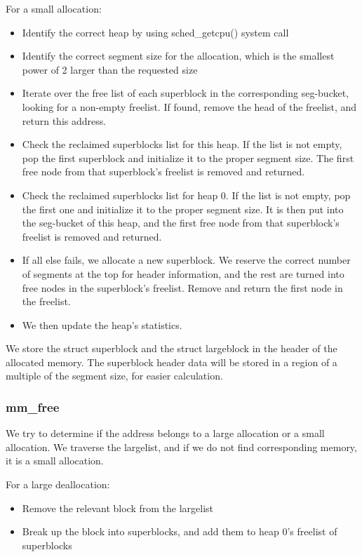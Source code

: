 \documentclass[a4paper, 12pt]{article}
\begin{document}
For a small allocation:

\begin{itemize}
	\item Identify the correct heap by using sched\_getcpu() system call
	\item Identify the correct segment size for the allocation, which is the smallest power of 2 larger than the requested size
	\item Iterate over the free list of each superblock in the corresponding seg-bucket, looking for a non-empty freelist. If found, remove the head of the freelist, and return this address.
	\item Check the reclaimed superblocks list for this heap. If the list is not empty, pop the first superblock and initialize it to the proper segment size. The first free node from that superblock's freelist is removed and returned.
	\item Check the reclaimed superblocks list for heap 0. If the list is not empty, pop the first one and initialize it to the proper segment size. It is then put into the seg-bucket of this heap, and the first free node from that superblock's freelist is removed and returned.
	\item If all else fails, we allocate a new superblock. We reserve the correct number of segments at the top for header information, and the rest are turned into free nodes in the superblock's freelist. Remove and return the first node in the freelist.
    \item We then update the heap's statistics.
\end{itemize}

We store the struct superblock and the struct largeblock in the header of the allocated memory. The superblock header data will be stored in a region of a multiple of the segment size, for easier calculation.

\subsubsection{mm\_free}

We try to determine if the address belongs to a large allocation or a small allocation. We traverse the largelist, and if we do not find corresponding memory, it is a small allocation.

For a large deallocation:

\begin{itemize}
	\item Remove the relevant block from the largelist
	\item Break up the block into superblocks, and add them to heap 0's freelist of superblocks
\end{itemize}
\end{document}
